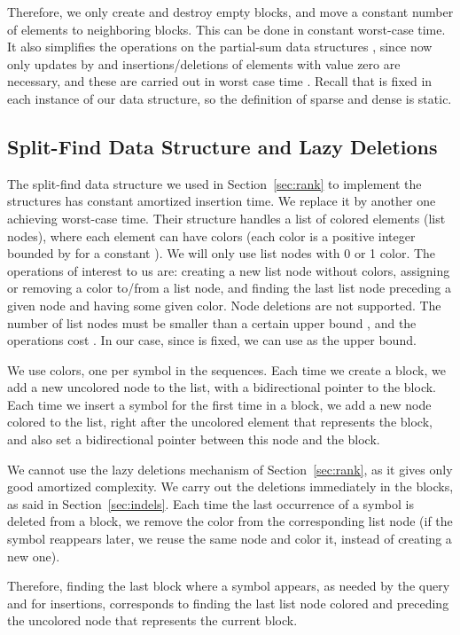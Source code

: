 \documentclass[11pt]{article}
\begin{document}
Therefore, we only create and destroy empty blocks, and move a constant 
number of elements to neighboring blocks. This can be done in constant
worst-case time. It also simplifies the operations on the partial-sum
data structures , since now only updates by  and insertions/deletions
of elements with value zero are necessary, and these are carried out in
 worst case time \cite[Lem.~1]{NS10}.
Recall that  is fixed in each instance of our data
structure, so the definition of sparse and dense is static.

\subsection{Split-Find Data Structure and Lazy Deletions}

The split-find data structure \cite{IA84} we used in Section~\ref{sec:rank}
to implement the  structures has constant amortized insertion time. We
replace it by  another one \cite[Thm 4.1]{Mor03} achieving 
worst-case time. Their structure handles a list of colored elements (list nodes), where
each element can have  colors (each color is a positive integer bounded by  for a constant ). 
We will only use list nodes with 0 or 1 color.
The operations of interest to us are: creating a new list node without colors, 
assigning or removing a color to/from a list node, and finding the last list node 
preceding a given node and having some given color. Node deletions are not
supported. The number of list nodes must be smaller than a certain upper bound ,
and the operations cost . In our case, since  is fixed,
we can use  as the upper bound.

We use  colors, one per symbol in the sequences. Each time we create
a block, we add a new uncolored node to the list, with a 
bidirectional pointer to the block. Each time we insert a symbol
 for the first time in a block, we add a new node colored
 to the list, right after the uncolored element that represents the block,
and also set a bidirectional pointer between this node and the block.

We cannot use the lazy deletions mechanism of Section~\ref{sec:rank}, as it
gives only good amortized complexity. We carry out the deletions immediately
in the blocks, as said in Section~\ref{sec:indels}.
Each time the last occurrence of a symbol  is deleted from a
block, we remove the color from the corresponding list node (if the symbol reappears
later, we reuse the same node and color it, instead of creating a new one). 

Therefore, finding
the last block where a symbol  appears, as needed by the  query and
for insertions, corresponds to finding the last list node colored  and
preceding the uncolored node that represents the current block.
\end{document}
